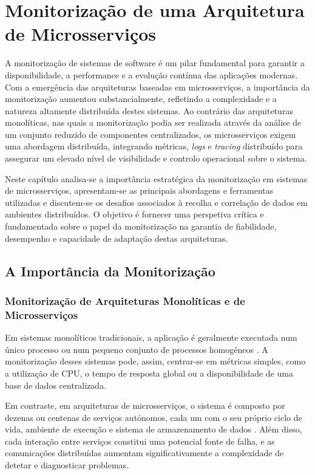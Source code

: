 \chapter{Monitorização de uma Arquitetura de Microsserviços}

A monitorização de sistemas de software é um pilar fundamental para garantir a disponibilidade, a performance e a evolução contínua das aplicações modernas. Com a emergência das arquiteturas baseadas em microsserviços, a importância da monitorização aumentou substancialmente, refletindo a complexidade e a natureza altamente distribuída destes sistemas. Ao contrário das arquiteturas monolíticas, nas quais a monitorização podia ser realizada através da análise de um conjunto reduzido de componentes centralizados, os microsserviços exigem uma abordagem distribuída, integrando métricas, \textit{logs} e \textit{tracing} distribuído para assegurar um elevado nível de visibilidade e controlo operacional sobre o sistema.

Neste capítulo analisa-se a importância estratégica da monitorização em sistemas de microsserviços, apresentam-se as principais abordagens e ferramentas utilizadas e discutem-se os desafios associados à recolha e correlação de dados em ambientes distribuídos. O objetivo é fornecer uma perspetiva crítica e fundamentada sobre o papel da monitorização na garantia de fiabilidade, desempenho e capacidade de adaptação destas arquiteturas.


\section{A Importância da Monitorização}

\subsection{Monitorização de Arquiteturas Monolíticas e de Microsserviços}

Em sistemas monolíticos tradicionais, a aplicação é geralmente executada num único processo ou num pequeno conjunto de processos homogéneos \cite{Villamizar2015}. A monitorização desses sistemas pode, assim, centrar-se em métricas simples, como a utilização de CPU, o tempo de resposta global ou a disponibilidade de uma base de dados centralizada. 

Em contraste, em arquiteturas de microsserviços, o sistema é composto por dezenas ou centenas de serviços autónomos, cada um com o seu próprio ciclo de vida, ambiente de execução e sistema de armazenamento de dados \cite{Newman2015}. Além disso, cada interação entre serviços constitui uma potencial fonte de falha, e as comunicações distribuídas aumentam significativamente a complexidade de detetar e diagnosticar problemas. 

